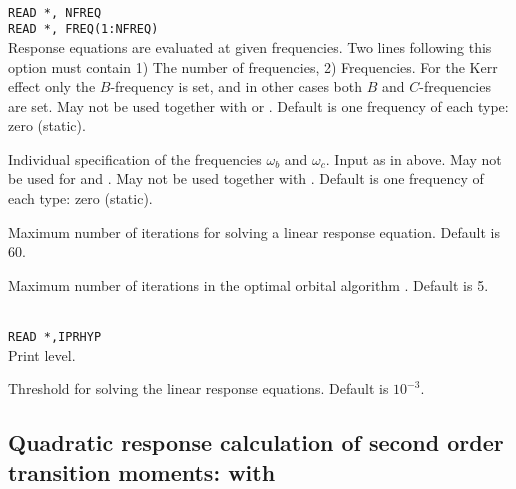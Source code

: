\begin{description}
\item{}\\
\verb|READ *, NFREQ|\\
\verb|READ *, FREQ(1:NFREQ)|\\
Response equations are evaluated at given
frequencies. Two lines 
following this option must contain 1) The number of frequencies, 2)
Frequencies.
For the Kerr effect only the $B$-frequency is set,
and in other cases both $B$ and $C$-frequencies are set.
May not be used together with  or .
Default is one frequency of each type: zero (static).

\item[\Key{BFREQ}, \Key{CFREQ}]
Individual specification of the frequencies $\omega_b$ and $\omega_c$.
Input as in  above.
May not be used for  and .
May not be used together with .
Default is one frequency of each type: zero (static).

\item{}
Maximum number of iterations for solving a linear response equation.
Default is 60.

\item{}
Maximum number of iterations in the optimal
orbital algorithm 
\cite{tuhjahjajpjjcp84}. 
Default is 5.

\item{}\\
\verb|READ *,IPRHYP|\\
Print level.

\item{}
Threshold for solving the linear response equations.
Default is $10^{-3}$.

\end{description}

\subsection{Quadratic response calculation of second order transition moments:
 with }


